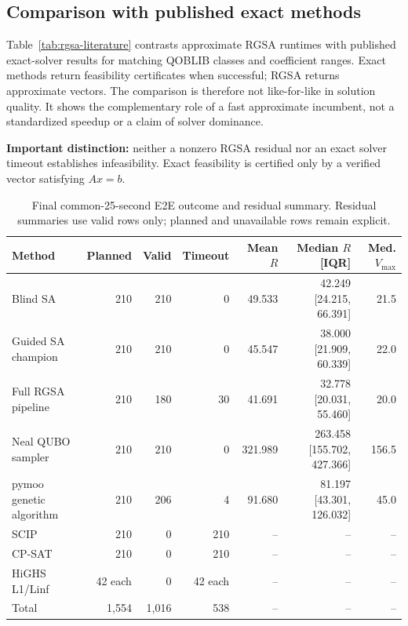 \documentclass[11pt]{article}
\begin{document}
\subsection{Comparison with published exact methods}
Table~\ref{tab:rgsa-literature} contrasts approximate RGSA runtimes with published exact-solver results for matching QOBLIB classes and coefficient ranges. Exact methods return feasibility certificates when successful; RGSA returns approximate vectors. The comparison is therefore not like-for-like in solution quality. It shows the complementary role of a fast approximate incumbent, not a standardized speedup or a claim of solver dominance.

\textbf{Important distinction:} neither a nonzero RGSA residual nor an exact solver timeout establishes infeasibility. Exact feasibility is certified only by a verified vector satisfying $Ax=b$.




\begin{table}[htbp]
\centering
\caption{Final common-25-second E2E outcome and residual summary. Residual summaries use valid rows only; planned and unavailable rows remain explicit.}
\footnotesize
\begin{tabular}{lrrrrrr}
\toprule
Method & Planned & Valid & Timeout & Mean $R$ & Median $R$ [IQR] & Med. $V_{\max}$ \\
\midrule
Blind SA & 210 & 210 & 0 & 49.533 & 42.249 [24.215, 66.391] & 21.5 \\
Guided SA champion & 210 & 210 & 0 & 45.547 & 38.000 [21.909, 60.339] & 22.0 \\
Full RGSA pipeline & 210 & 180 & 30 & 41.691 & 32.778 [20.031, 55.460] & 20.0 \\
Neal QUBO sampler & 210 & 210 & 0 & 321.989 & 263.458 [155.702, 427.366] & 156.5 \\
pymoo genetic algorithm & 210 & 206 & 4 & 91.680 & 81.197 [43.301, 126.032] & 45.0 \\
SCIP & 210 & 0 & 210 & -- & -- & -- \\
CP-SAT & 210 & 0 & 210 & -- & -- & -- \\
HiGHS L1/Linf & 42 each & 0 & 42 each & -- & -- & -- \\
Total & 1,554 & 1,016 & 538 & -- & -- & -- \\
\bottomrule
\end{tabular}
\end{table}
\end{document}
